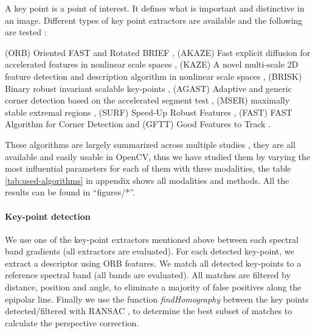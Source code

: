 \documentclass[]{elsarticle}
\begin{document}
	A key point is a point of interest. It defines what is important and distinctive in an image.
	Different types of key point extractors are available and the following are tested :
	\\
	\par (ORB) Oriented FAST and Rotated BRIEF \cite{Rublee:2011:OEA:2355573.2356268}, 
	(AKAZE) Fast explicit diffusion for accelerated features in nonlinear scale spaces \cite{alcantarilla2011fast}, 
	(KAZE) A novel multi-scale 2D feature detection and description algorithm in nonlinear scale spaces \cite{rs10050756}, 
	(BRISK) Binary robust invariant scalable key-points \cite{leutenegger2011brisk}, 
	(AGAST) Adaptive and generic corner detection based on the accelerated segment test \cite{mair2010adaptive}, 
	(MSER) maximally stable extremal regions \cite{donoser2006efficient}, 
	(SURF) Speed-Up Robust Features \cite{bay2006surf}, 
	(FAST) FAST Algorithm for Corner Detection \cite{trajkovic1998fast}
	and (GFTT) Good Features to Track \cite{shi1994good}.
	\\
	\par These algorithms are largely summarized across multiple studies \cite{DantasDiasJunior, Tareen2018ACA, Zhang2016EXTENSIONAE, ali2016comparison},
	they are all available and easily usable in OpenCV, thus we have studied them by varying the most influential parameters for each of them with three modalities,
	the table \ref{tab:used-algorithms} in appendix shows all modalities and methods.
	All the results can be found in ``figures/*''.
	
	\paragraph{Key-point detection} \label{sec:perspective}
	We use one of the key-point extractors mentioned above between each spectral band gradients (all extractors are evaluated).
	For each detected key-point, we extract a descriptor using ORB features.
	We match all detected key-points to a reference spectral band (all bands are evaluated).
	All matches are filtered by distance, position and angle, to eliminate a majority of false positives along the epipolar line.
	Finally we use the function \textit{findHomography} between the key points detected/filtered with RANSAC \cite{Fischler:1981:RSC:358669.358692},
	to determine the best subset of matches to calculate the perspective correction.
	
	
\end{document}
